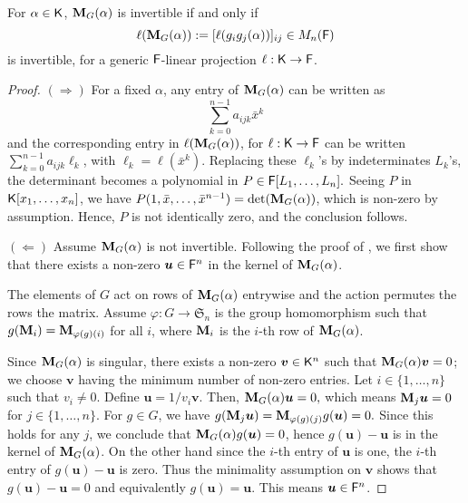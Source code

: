 \begin{lemma}\label{Lem:Proj}
  For $\alpha \in {\mathsf{K}}$, $\mat M_G(\alpha)$ is invertible if and only
  if $$\ell(\mat M_G(\alpha)) := [\ell(g_ig_j(\alpha))]_{ij} \in M_n(\F)$$
  is invertible, for a generic ${\mathsf{F}}$-linear projection $\ell: {\mathsf{K}} \to
  {\mathsf{F}}$.
\end{lemma}
\begin{proof}
$(\Rightarrow)$ For a fixed $\alpha$, any entry of $\mat M_G(\alpha)$
  can be written as
\begin{equation}\label{Eq:PrimElm}
\sum_{k= 0}^{n-1} a_{ijk}\bar x^k
\end{equation}
 and the corresponding entry in $\ell(\mat M_G(\alpha))$, for $\ell:
 {\mathsf{K}} \to {\mathsf{F}}$ can be written $\sum_{k= 0}^{n-1} a_{ijk}\ell_k$, with
 $\ell_k = \ell(\bar x^k)$. Replacing these $\ell_k$'s by
 indeterminates $L_k$'s, the determinant becomes a polynomial in $P
 \in {\mathsf{F}}[L_1, \ldots, L_n].$ Seeing $P$ in ${\mathsf{K}}[x_1, \ldots , x_n]$, we
 have $ P(1, \bar x, \ldots, \bar x^{n-1}) = \det(\mat M_G(\alpha))$,
 which is non-zero by assumption. Hence,
 $P$ is not identically zero, and the conclusion follows.
 
 $(\Leftarrow)$ Assume $\mat M_G(\alpha)$ is not invertible. Following
 the proof of \cite[Lemma 4]{Jam18}, we first show that there exists a
 non-zero $\boldsymbol{u} \in {\mathsf{F}}^n$ in the kernel of $\mat
 M_G(\alpha)$.

 The elements of $G$ act on rows of $\mat M_G(\alpha)$ entrywise and
 the action permutes the rows the matrix. Assume $\varphi : G \to
 \mathfrak{S}_n$ is the group homomorphism such that $g(\mat M_i) =
 \mat M_{\varphi(g)(i)}$ for all $i$, where $\mat M_i$ is the $i$-th row of $\mat
 M_G(\alpha)$.
 
  Since $\mat M_G(\alpha)$ is singular, there exists a non-zero
  $\boldsymbol{v} \in {\mathsf{K}}^n$ such that $\mat M_G(\alpha)\boldsymbol{v}
  = 0$; we choose $\boldsymbol{v}$ having the minimum number of
  non-zero entries. Let $i \in \lbrace 1, \ldots , n \rbrace$ such
  that $v_i \neq 0$. Define $\boldsymbol{u} =
  1/v_i\boldsymbol{v}$. Then, $\mat M_G(\alpha)\boldsymbol{u} = 0,$
  which means $\mat M_j \boldsymbol{u} = 0 $ for $j \in \lbrace 1,
  \ldots, n \rbrace$. For $g \in G$, we have $g(\mat M_j \boldsymbol{u}) =
  \mat M_{\varphi(g)(j)} g(\boldsymbol{u})= 0.$ Since this holds
  for any $j$, we conclude that $\mat M_G(\alpha)g(\boldsymbol{u})= 0$,  hence
  $g(\boldsymbol{u})-\boldsymbol{u}$ is in the kernel of $\mat M_G(\alpha)$. On the
  other hand since the $i$-th entry of $\boldsymbol{u}$ is one, the $i$-th
  entry of $g(\boldsymbol{u}) -\boldsymbol{u}$ is zero. Thus the minimality
  assumption on $\textbf{v}$ shows that $g(\boldsymbol{u}) -\boldsymbol{u} =
  0$ and equivalently $g(\boldsymbol{u})=\boldsymbol{u}$. This means
  $\boldsymbol{u} \in {\mathsf{F}}^n$.
  

\end{proof}
